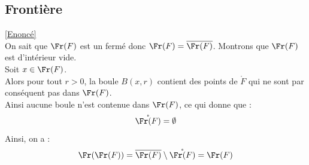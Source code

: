 \documentclass{book}
\begin{document}
	\subsection{Frontière }
	\label{sec:frontiere}
	\textcolor{blue}{\hyperref[Frontière]{[Enoncé]}}\\
	On sait que $\Fr(F)$ est un fermé donc $\Fr(F)=\overline{\Fr(F)}$.
	Montrons que $\Fr(F)$ est d'intérieur vide.\\
	Soit $x\in\Fr(F)$.\\
	Alors pour tout $r>0$, la boule $B(x,r)$ contient des points de $\ring F$ qui ne sont par conséquent pas dans $\Fr(F)$.\\
	Ainsi aucune boule n'est contenue dans $\Fr(F)$, ce qui donne que : \[\mathring{\Fr(F)}=\emptyset\]
	Ainsi, on a :\[\Fr(\Fr(F))=\overline{\Fr(F)}\setminus\mathring{\Fr(F)}=\Fr(F)\]
	
\end{document}
